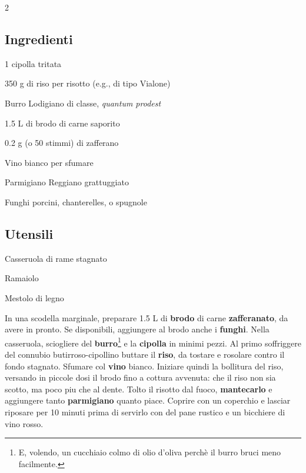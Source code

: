 \newpage
{}

\begin{multicols}{2}
	\subsection*{Ingredienti}
	\begin{ingredients}
		\item 1 cipolla tritata
		\item 350 g di riso per risotto (e.g., di tipo Vialone)
		\item Burro Lodigiano di classe, \textit{quantum prodest}
		\item 1.5 L di brodo di carne saporito
		\item 0.2 g (o 50 stimmi) di zafferano
		\item Vino bianco per sfumare
		\item Parmigiano Reggiano grattuggiato
		\item Funghi porcini, chanterelles, o spugnole
	\end{ingredients}
	
	\columnbreak
	
	\subsection*{Utensili}
	\begin{equipment}
		\item Casseruola di rame stagnato
		\item Ramaiolo
		\item Mestolo di legno
	
	\end{equipment}
	\vfill
	\end{multicols}

\medskip

In una scodella marginale, preparare 1.5 L di \textbf{brodo} di carne \textbf{zafferanato}, da avere in pronto. 
Se disponibili, aggiungere al brodo anche i \textbf{funghi}. 
Nella casseruola, sciogliere del \textbf{burro}\footnote{E, volendo, un cucchiaio colmo di olio d'oliva perchè il burro bruci meno facilmente.} e la \textbf{cipolla} in minimi pezzi.
Al primo soffriggere del connubio butirroso-cipollino buttare il \textbf{riso}, da tostare e rosolare contro il fondo stagnato. 
Sfumare col \textbf{vino} bianco.
Iniziare quindi la bollitura del riso, versando in piccole dosi il brodo fino a cottura avvenuta: che il riso non sia scotto, ma poco piu che al dente. 
Tolto il risotto dal fuoco, \textbf{mantecarlo} e aggiungere tanto \textbf{parmigiano} quanto piace. 
Coprire con un coperchio e lasciar riposare per 10 minuti prima di servirlo con del pane rustico e un bicchiere di vino rosso. 


\vspace*{0.75 cm}

\begin{recipeblock}
	
\end{recipeblock}